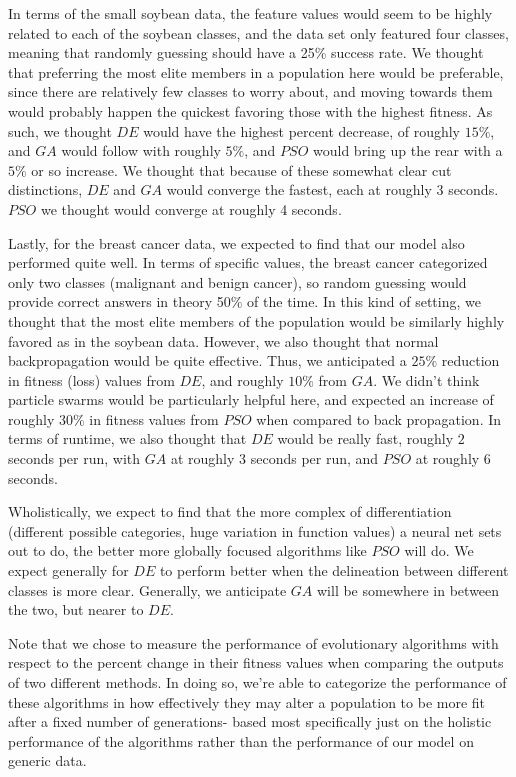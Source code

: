 \documentclass[twoside,11pt]{article}
\begin{document}
  In terms of the small soybean data, the feature values would seem to be highly related to each of the soybean classes, and the data set only featured four classes,
  meaning that randomly guessing should have a 25\% success rate. We thought that preferring the most elite members in a population here would be preferable, since there
  are relatively few classes to worry about, and moving towards them would probably happen the quickest favoring those with the highest fitness. As such, we thought
  $DE$ would have the highest percent decrease, of roughly $15\%$, and $GA$ would follow with roughly $5\%$, and $PSO$ would bring up the rear with a $5\%$ or so increase.
  We thought that because of these somewhat clear cut distinctions, $DE$ and $GA$ would converge the fastest, each at roughly 3 seconds. $PSO$ we thought would
  converge at roughly 4 seconds. 

  Lastly, for the breast cancer data, we expected to find that our model also performed quite well. In terms of specific values, the breast cancer categorized
  only two classes (malignant and benign cancer), so random guessing would provide correct answers in theory 50\% of the time. In this kind of setting, we thought
  that the most elite members of the population would be similarly highly favored as in the soybean data. However, we also thought that normal backpropagation would
  be quite effective. Thus, we anticipated a $25\%$ reduction in
  fitness (loss) values from $DE$, and roughly $10\%$ from $GA$. We didn't think particle swarms would be particularly helpful here, and expected an increase of 
  roughly $30\%$ in fitness values from $PSO$ when compared to back propagation. 
  In terms of runtime, we also thought that $DE$ would be really fast, roughly $2$ seconds per run, with $GA$ at roughly
  3 seconds per run, and $PSO$ at roughly 6 seconds.

  Wholistically, we expect to find that the more complex of differentiation (different possible categories, huge variation in function values) a neural net sets out to do, 
  the better more globally focused algorithms like $PSO$ will do. We expect generally for $DE$ to perform better when the delineation between different classes is more clear.
  Generally, we anticipate $GA$ will be somewhere in between the two, but nearer to $DE$.

  Note that we chose to measure the performance of evolutionary algorithms with respect to the percent change in their fitness values when comparing the outputs of two
  different methods. In doing so, we're able to categorize the performance of these algorithms in how effectively they may alter a population
  to be more fit after a fixed number of generations- based most specifically just on the holistic performance of the algorithms rather than the performance of
  our model on generic data.
  
\end{document}

